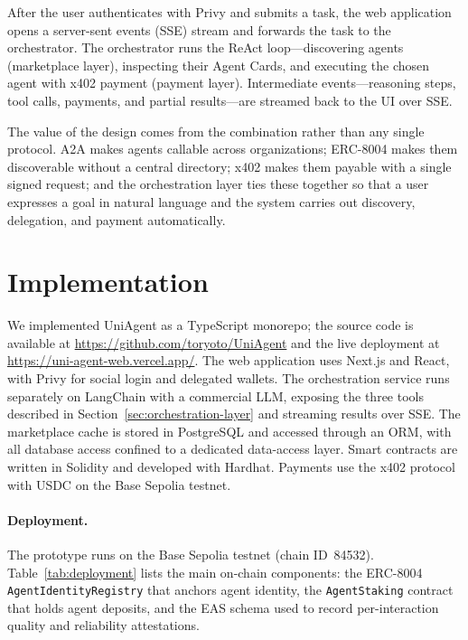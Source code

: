 \documentclass[sigconf]{acmart}
\begin{document}
After the user authenticates with Privy and submits a task, the web
application opens a server-sent events (SSE) stream and forwards the
task to the orchestrator. The orchestrator runs the ReAct
loop---discovering agents (marketplace layer), inspecting their Agent
Cards, and executing the chosen agent with x402 payment (payment
layer). Intermediate events---reasoning steps, tool calls, payments,
and partial results---are streamed back to the UI over SSE.

The value of the design comes from the combination rather than any
single protocol. A2A makes agents callable across organizations;
ERC-8004 makes them discoverable without a central directory; x402
makes them payable with a single signed request; and the orchestration
layer ties these together so that a user expresses a goal in natural
language and the system carries out discovery, delegation, and payment
automatically.

\section{Implementation}
\label{sec:implementation}

We implemented UniAgent as a TypeScript monorepo; the source code is
available at \url{https://github.com/toryoto/UniAgent} and the live
deployment at \url{https://uni-agent-web.vercel.app/}. The web application
uses Next.js and React, with Privy for social login and delegated wallets.
The orchestration service runs separately on LangChain with a commercial
LLM, exposing the three tools described in
Section~\ref{sec:orchestration-layer} and streaming results over SSE.
The marketplace cache is stored in PostgreSQL and accessed through an
ORM, with all database access confined to a dedicated data-access layer.
Smart contracts are written in Solidity and developed with Hardhat.
Payments use the x402 protocol with USDC on the Base Sepolia testnet.

\paragraph{Deployment.}
The prototype runs on the Base Sepolia testnet (chain ID~84532).
Table~\ref{tab:deployment} lists the main on-chain components: the
ERC-8004 \texttt{AgentIdentityRegistry} that anchors agent identity, the
\texttt{AgentStaking} contract that holds agent deposits, and the EAS
schema used to record per-interaction quality
and reliability attestations.
\end{document}
